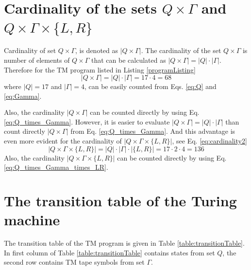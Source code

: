 \documentclass[12pt, a4paper]{report}
\begin{document}
{	\section{Cardinality of the sets $ Q \times \Gamma$ and $ Q \times \Gamma \times \{L, R\} $}
	Cardinality of set $ Q \times \Gamma $, is denoted as $ |Q \times \Gamma| $. The cardinality of the set $ Q \times \Gamma $ is number of elements of $ Q \times \Gamma $ that can be calculated as $ |Q \times \Gamma| = |Q| \cdot |\Gamma| $. Therefore for the TM program listed in Listing \ref{programListing}
	\begin{equation}\label{eq:cardinality2}
		|Q \times \Gamma| = |Q| \cdot |\Gamma| = 17 \cdot 4 = 68
	\end{equation}
	where $ |Q| = 17 $ and $ |\Gamma| = 4 $, can be easily counted from Eqs. \eqref{eq:Q} and \eqref{eq:Gamma}.
	
	Also, the cardinality $ |Q \times \Gamma| $ can be counted directly by using Eq. \eqref{eq:Q_times_Gamma}. However, it is easier to evaluate $ {|Q \times \Gamma| = {|Q|}\cdot|\Gamma|}$ than count directly $ |Q \times \Gamma| $ from Eq. \eqref{eq:Q_times_Gamma}. And this  advantage is even more evident for the cardinality of $ |Q \times \Gamma \times \{L, R\}| $, see Eq. \eqref{eq:cardinality2}
	\begin{equation}\label{eq:cardinality2}
		|Q \times \Gamma \times \{L, R\}| = |Q| \cdot |\Gamma| \cdot |\{L, R\}| = 17 \cdot 2 \cdot 4 = 136
	\end{equation}
	Also, the cardinality $ |Q \times \Gamma \times \{L, R\}| $ can be counted directly by using Eq. \eqref{eq:Q_times_Gamma_times_LR}.
	
	\newpage
	\section{The transition table of the Turing machine}
	The transition table of the TM program is given in Table \ref{table:transitionTable}. In first column of Table \ref{table:transitionTable} contains states from set $ Q $, the second row contains TM tape symbols from set $ \Gamma $.


}
\end{document}
